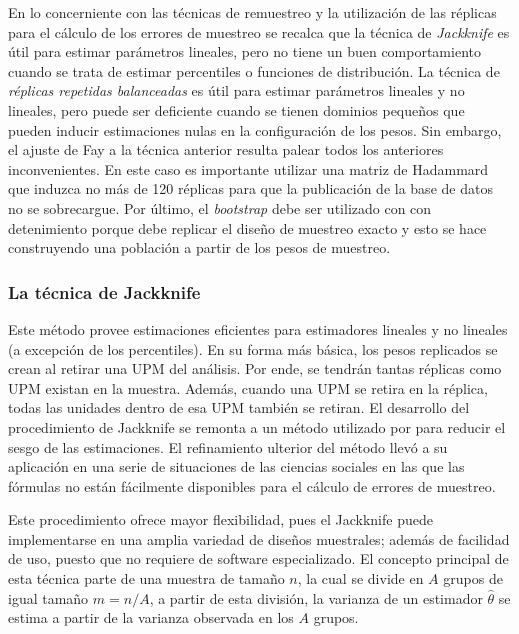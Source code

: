 \documentclass[
  10pt,
  spanish,
]{book}
\begin{document}
En lo concerniente con las técnicas de remuestreo y la utilización de las réplicas para el cálculo de los errores de muestreo se recalca que la técnica de \emph{Jackknife} es útil para estimar parámetros lineales, pero no tiene un buen comportamiento cuando se trata de estimar percentiles o funciones de distribución. La técnica de \emph{réplicas repetidas balanceadas} es útil para estimar parámetros lineales y no lineales, pero puede ser deficiente cuando se tienen dominios pequeños que pueden inducir estimaciones nulas en la configuración de los pesos. Sin embargo, el ajuste de Fay a la técnica anterior resulta palear todos los anteriores inconvenientes. En este caso es importante utilizar una matriz de Hadammard que induzca no más de 120 réplicas para que la publicación de la base de datos no se sobrecargue. Por último, el \emph{bootstrap} debe ser utilizado con con detenimiento porque debe replicar el diseño de muestreo exacto y esto se hace construyendo una población a partir de los pesos de muestreo.

\hypertarget{la-tuxe9cnica-de-jackknife}{%
\subsubsection*{La técnica de Jackknife}\label{la-tuxe9cnica-de-jackknife}}

Este método provee estimaciones eficientes para estimadores lineales y no lineales (a excepción de los percentiles). En su forma más básica, los pesos replicados se crean al retirar una UPM del análisis. Por ende, se tendrán tantas réplicas como UPM existan en la muestra. Además, cuando una UPM se retira en la réplica, todas las unidades dentro de esa UPM también se retiran. El desarrollo del procedimiento de Jackknife se remonta a un método utilizado por \citet{Quenouille} para reducir el sesgo de las estimaciones. El refinamiento ulterior del método \citep{mosteller1968data} llevó a su aplicación en una serie de situaciones de las ciencias sociales en las que las fórmulas no están fácilmente disponibles para el cálculo de errores de muestreo.

Este procedimiento ofrece mayor flexibilidad, pues el Jackknife puede implementarse en una amplia variedad de diseños muestrales; además de facilidad de uso, puesto que no requiere de software especializado. El concepto principal de esta técnica parte de una muestra de tamaño \(n\), la cual se divide en \(A\) grupos de igual tamaño \(m=n/A\), a partir de esta división, la varianza de un estimador \(\hat{\theta}\) se estima a partir de la varianza observada en los \(A\) grupos.
\end{document}
